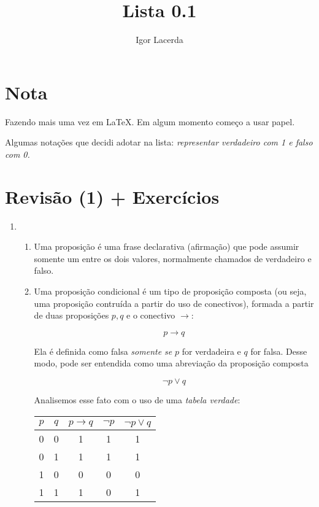 \documentclass[12pt]{article}
\title{Lista 0.1}
\author{Igor Lacerda}
\begin{document}
\maketitle
\section*{Nota}
Fazendo mais uma vez em \LaTeX. Em algum momento começo a usar papel.

Algumas notações que decidi adotar na lista: \textit{representar verdadeiro com 1 e falso com 0.}

\section*{Revisão (1) + Exercícios}
\begin{enumerate}
    \item 
        \begin{enumerate}
            \item Uma proposição é uma frase declarativa (afirmação) que pode assumir somente um entre os dois valores, normalmente chamados de verdadeiro e falso.

            \item Uma proposição condicional é um tipo de proposição composta (ou seja, uma proposição contruída a partir do uso de conectivos), formada a partir de duas proposições \( p,q \) e o conectivo \( \to \):

                \[ p \to q \]

                Ela é definida como falsa \textit{somente se} \( p \) for verdadeira e \( q \) for falsa. Desse modo, pode ser entendida como uma abreviação da proposição composta 

                \[ \neg p \lor q \] 

                Analisemos esse fato com o uso de uma \textit{tabela verdade}:
                \begin{center}
                    \begin{tabular}{||c c c c c||} 
                        \hline
                        \( p \)  & \( q \)  & \( p \to q \)  & \( \neg p \) & \( \neg p \lor q\)  \\ [0.5ex] 
                        \hline\hline
                        0 & 0 & 1 & 1 & 1 \\ 
                        \hline
                        0 & 1 & 1 & 1 & 1 \\
                        \hline
                        1 & 0 & 0 & 0 & 0 \\
                        \hline
                        1 & 1 & 1 & 0 & 1 \\ [1ex]
                        \hline
                    \end{tabular}
                \end{center}


\end{enumerate}
\end{enumerate}
\end{document}
